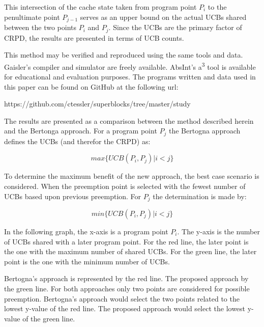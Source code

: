 This intersection of the cache state taken from program point ${P_i}$
to the penultimate point ${P_{j-1}}$ serves as an upper bound on the
actual UCBs shared between the two points ${P_i}$ and ${P_j}$. Since
the UCBs are the primary factor of CRPD, the results are presented in
terms of UCB counts.

This method may be verified and reproduced using the same tools and
data. Gaisler's compiler and simulator are freely available. AbsInt's
a\textsuperscript{3} tool is available for educational and evaluation
purposes. The programs written and data used in this paper can be
found on GitHub at the following url:

\begin{center}
https://github.com/ctessler/superblocks/tree/master/study
\end{center}

The results are presented as a comparison between the method described
herein and the Bertonga approach. For a program point ${P_j}$ the
Bertogna approach defines the UCBs (and therefor the CRPD) as:

\begin{equation*}
  max\{ UCB(P_i, P_j) \vert i < j \}
\end{equation*}

To determine the maximum benefit of the new approach, the best case
scenario is considered. When the preemption point is selected with the
fewest number of UCBs based upon previous preemption.  For ${P_j}$ the
determination is made by:

\begin{equation*}
  min\{ UCB(P_i, P_j) \vert i < j \}
\end{equation*}

In the following graph, the x-axis is a program point ${P_i}$. The
y-axis is the number of UCBs shared with a later program point. For
the red line, the later point is the one with the maximum number of
shared UCBs. For the green line, the later point is the one with the
minimum number of UCBs.

Bertogna's approach is represented by the red line. The proposed
approach by the green line. For both approaches only two points are
considered for possible preemption. Bertogna's approach would select
the two points related to the lowest y-value of the red line. The
proposed approach would select the lowest y-value of the green line.

